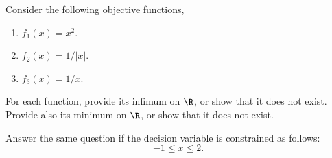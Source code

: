 
Consider the following objective functions,
\begin{enumerate}
\item $f_1(x)=x^2.$
\item $f_2(x)= 1/|x|.$
\item $f_3(x)= 1/x.$
\end{enumerate}

For each function, provide its infimum on $\R$, or show that it does not
exist. Provide also its minimum on $\R$, or show that it does not exist.

Answer the same question if the decision variable is constrained as follows:
$$ -1\leq x \leq 2.$$
